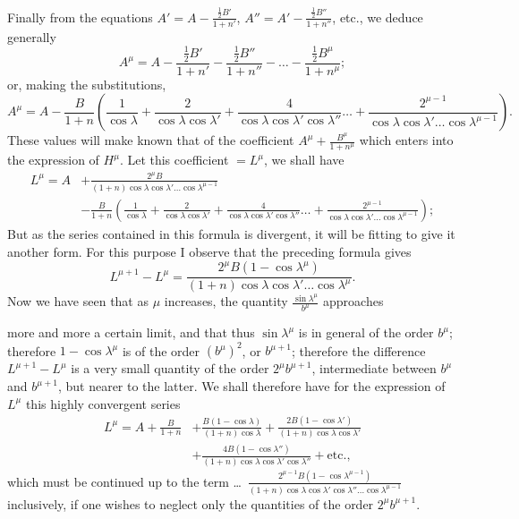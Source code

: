 \documentclass{article}
\begin{document}
Finally from the equations $A'=A-\frac{\frac{1}{2}B'}{1+n'}$, $A''=A'-\frac{\frac{1}{2}B''}{1+n''}$, etc., we deduce generally
\[ A^{\mu}=A-\frac{\tfrac{1}{2}B'}{1+n'}-\frac{\tfrac{1}{2}B''}{1+n''}-\ldots-\frac{\tfrac{1}{2}B^{\mu}}{1+n^{\mu}}; \]
or, making the substitutions,
\[ A^{\mu}=A-\frac{B}{1+n}\left(\frac{1}{\cos\lambda}+\frac{2}{\cos\lambda\cos\lambda'}+\frac{4}{\cos\lambda\cos\lambda'\cos\lambda''}\ldots+\frac{2^{\mu-1}}{\cos\lambda\cos\lambda'\ldots\cos\lambda^{\mu-1}}\right). \]
These values will make known that of the coefficient $A^{\mu}+\frac{B^{\mu}}{1+n^{\mu}}$ which enters into the expression of $H^{\mu}$. Let this coefficient $=L^{\mu}$, we shall have
\[ \begin{aligned} L^{\mu}=A&+\frac{2^{\mu}B}{(1+n)\cos\lambda\cos\lambda'\ldots\cos\lambda^{\mu-1}}\\ &-\frac{B}{1+n}\left(\frac{1}{\cos\lambda}+\frac{2}{\cos\lambda\cos\lambda'}+\frac{4}{\cos\lambda\cos\lambda'\cos\lambda''}\ldots+\frac{2^{\mu-1}}{\cos\lambda\cos\lambda'\ldots\cos\lambda^{\mu-1}}\right); \end{aligned} \]
But as the series contained in this formula is divergent, it will be fitting to give it another form. For this purpose I observe that the preceding formula gives
\[ L^{\mu+1}-L^{\mu}=\frac{2^{\mu}B(1-\cos\lambda^{\mu})}{(1+n)\cos\lambda\cos\lambda'\ldots\cos\lambda^{\mu}}. \]
Now we have seen that as $\mu$ increases, the quantity $\frac{\sin\lambda^{\mu}}{b^{\mu}}$ approaches

more and more a certain limit, and that thus $\sin\lambda^{\mu}$ is in general of the order $b^{\mu}$; therefore $1-\cos\lambda^{\mu}$ is of the order $(b^{\mu})^{2}$, or $b^{\mu+1}$; therefore the difference $L^{\mu+1}-L^{\mu}$ is a very small quantity of the order $2^{\mu}b^{\mu+1}$, intermediate between $b^{\mu}$ and $b^{\mu+1}$, but nearer to the latter. We shall therefore have for the expression of $L^{\mu}$ this highly convergent series
\[ \begin{aligned} L^{\mu}=A+\frac{B}{1+n}&+\frac{B(1-\cos\lambda)}{(1+n)\cos\lambda}+\frac{2B(1-\cos\lambda')}{(1+n)\cos\lambda\cos\lambda'}\\ &+\frac{4B(1-\cos\lambda'')}{(1+n)\cos\lambda\cos\lambda'\cos\lambda''}+\text{etc.}, \end{aligned} \]
which must be continued up to the term \ldots\ $\frac{2^{\mu-1}B(1-\cos\lambda^{\mu-1})}{(1+n)\cos\lambda\cos\lambda'\cos\lambda''\ldots\cos\lambda^{\mu-1}}$ inclusively, if one wishes to neglect only the quantities of the order $2^{\mu}b^{\mu+1}$.
\end{document}

